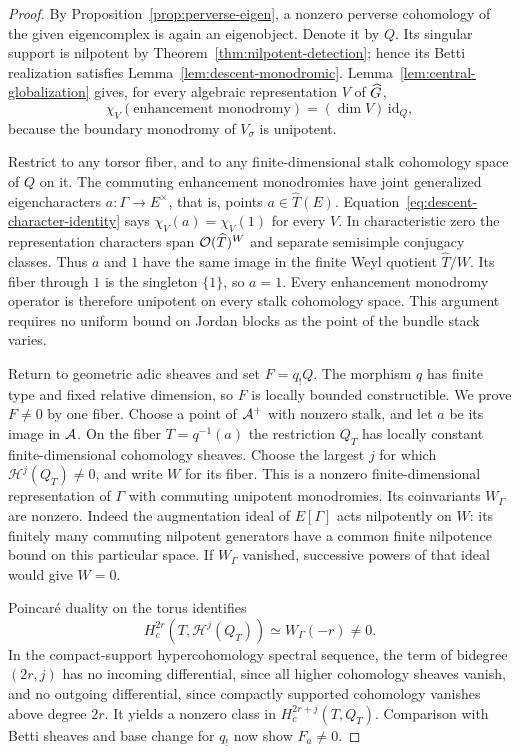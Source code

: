 \begin{proof}
By Proposition~\ref{prop:perverse-eigen}, a nonzero perverse cohomology
of the given eigencomplex is again an eigenobject.  Denote it by
$Q$.  Its singular support is nilpotent by
Theorem~\ref{thm:nilpotent-detection}; hence its Betti realization
satisfies Lemma~\ref{lem:descent-monodromic}.
Lemma~\ref{lem:central-globalization} gives, for every algebraic
representation $V$ of $\widehat G$,
\begin{equation}\label{eq:descent-character-identity}
 \chi_V(\text{enhancement monodromy})=(\dim V)\,\mathrm{id}_Q,
\end{equation}
because the boundary monodromy of $V_\sigma$ is unipotent.

Restrict to any torsor fiber, and to any finite-dimensional stalk
cohomology space of $Q$ on it.  The commuting enhancement
monodromies have joint generalized eigencharacters
$a:\Gamma\to E^\times$, that is, points $a\in\widehat T(E)$.
Equation~\eqref{eq:descent-character-identity} says
$\chi_V(a)=\chi_V(1)$ for every $V$.  In characteristic zero the
representation characters span $\mathcal O(\widehat T)^W$ and separate
semisimple conjugacy classes.  Thus $a$ and $1$ have the same image
in the finite Weyl quotient $\widehat T/W$.  Its fiber through $1$
is the singleton $\{1\}$, so $a=1$.
Every enhancement monodromy operator is therefore unipotent on
every stalk cohomology space.  This argument requires no uniform
bound on Jordan blocks as the point of the bundle stack varies.

Return to geometric adic sheaves and set $F=q_!Q$.
The morphism $q$ has finite type and fixed relative dimension, so
$F$ is locally bounded constructible.  We prove $F\ne0$ by one
fiber.  Choose a point of $\mathcal A^+$ with nonzero stalk, and let $a$ be
its image in $\mathcal A$.  On the fiber $T=q^{-1}(a)$ the restriction
$Q_T$ has locally constant finite-dimensional cohomology sheaves.
Choose the largest $j$ for which $\mathcal H^j(Q_T)\ne0$, and
write $W$ for its fiber.  This is a nonzero finite-dimensional
representation of $\Gamma$ with commuting unipotent monodromies.
Its coinvariants $W_\Gamma$ are nonzero.  Indeed the augmentation
ideal of $E[\Gamma]$ acts nilpotently on $W$: its finitely many
commuting nilpotent generators have a common finite nilpotence
bound on this particular space.  If $W_\Gamma$ vanished, successive
powers of that ideal would give $W=0$.

Poincar\'e duality on the torus identifies
\[
 H_c^{2r}(T,\mathcal H^j(Q_T))\simeq W_\Gamma(-r)\ne0.
\]
In the compact-support hypercohomology spectral sequence, the term
of bidegree $(2r,j)$ has no incoming differential, since all higher
cohomology sheaves vanish, and no outgoing differential, since
compactly supported cohomology vanishes above degree $2r$.
It yields a nonzero class in $H_c^{2r+j}(T,Q_T)$.
Comparison with Betti sheaves and base change for $q_!$ now show
$F_a\ne0$.


\end{proof}
